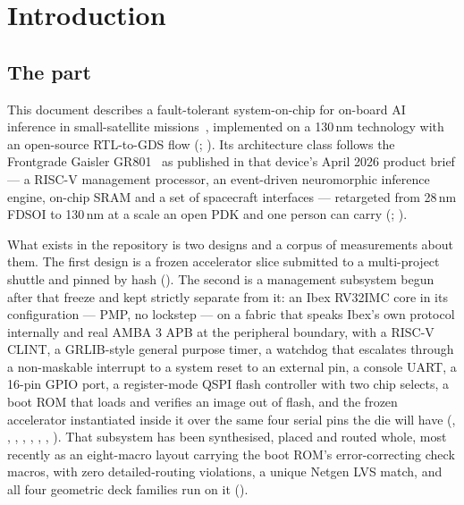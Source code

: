 
\chapter{Introduction}
\label{ch:intro}

\section{The part}
\label{sec:intro-part}

This document describes a fault-tolerant system-on-chip for on-board AI
inference in small-satellite missions~\cite{naoukin2023}, implemented on
a 130\,nm technology with an open-source RTL-to-GDS flow
(; ). Its architecture class
follows the Frontgrade Gaisler GR801~\cite{gr801} as published in that
device's April 2026 product brief --- a RISC-V management processor, an
event-driven neuromorphic inference engine, on-chip SRAM and a set of
spacecraft interfaces --- retargeted from 28\,nm FDSOI to 130\,nm at a scale an open
PDK and one person can carry
(; ).

What exists in the repository is two designs and a corpus of
measurements about them. The first design is a frozen accelerator slice
submitted to a multi-project shuttle and pinned by hash
(). The second is a management subsystem begun
after that freeze and kept strictly separate from it: an Ibex RV32IMC
core in its  configuration --- PMP, no lockstep --- on a
fabric that speaks Ibex's own protocol internally and real AMBA 3 APB at
the peripheral boundary, with a RISC-V CLINT, a GRLIB-style general
purpose timer, a watchdog that escalates through a non-maskable
interrupt to a system reset to an external pin, a console UART, a 16-pin
GPIO port, a register-mode QSPI flash controller with two chip selects,
a boot ROM that loads and verifies an image out of flash, and the frozen
accelerator instantiated inside it over the same four serial pins the
die will have (, , ,
, , , , ).
That subsystem has been synthesised, placed and routed whole, most
recently as an eight-macro layout carrying the boot ROM's
error-correcting check macros, with zero detailed-routing violations, a
unique Netgen LVS match, and all four geometric deck families run on it
().

